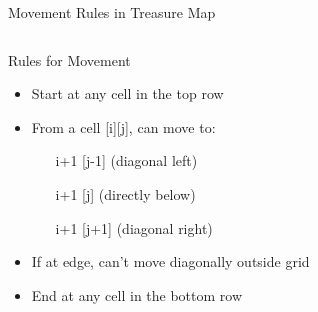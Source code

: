 \documentclass{beamer}
\begin{document}
\begin{frame}{Movement Rules in Treasure Map}
    \begin{columns}
        \begin{column}{0.6\textwidth}
            \begin{block}{Rules for Movement}
                \begin{itemize}
                    \item Start at any cell in the top row
                    \item From a cell [i][j], can move to:
                    \begin{itemize}
                        \item [i+1][j-1] (diagonal left)
                        \item [i+1][j] (directly below)
                        \item [i+1][j+1] (diagonal right)
                    \end{itemize}
                    \item If at edge, can't move diagonally outside grid
                    \item End at any cell in the bottom row
                \end{itemize}
            \end{block}
        \end{column}
        \begin{column}{0.4\textwidth}
            \begin{center}
            \end{center}
        \end{column}
    \end{columns}
\end{frame}
\end{document}
